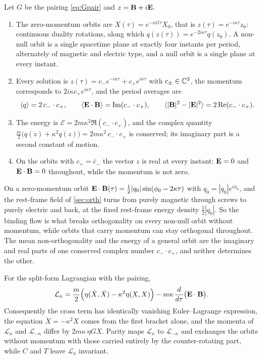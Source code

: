 \begin{proposition}
\label{prop:orbitsEM}
Let $G$ be the pairing \eqref{eq:Gpair} and $z=\mathbf B+i\mathbf E$.
\begin{enumerate}[label=(\roman*),leftmargin=2.2em]
\item The zero-momentum orbits are $X(\tau)=e^{-\kappa G\tau}X_0$, that is $z(\tau)=e^{-i\kappa\tau}z_0$: continuous duality rotations, along which
$q(z(\tau))=e^{-2i\kappa\tau}q(z_0)$. A non-null orbit is a single spacetime plane at exactly four instants per period, alternately of magnetic
and electric type, and a null orbit is a single plane at every instant.
\item Every solution is $z(\tau)=c_-e^{-i\kappa\tau}+c_+e^{i\kappa\tau}$ with $c_\pm\in\mathbb{C}^3$, the momentum corresponds to $2i\kappa c_+e^{i\kappa\tau}$, and the
period averages are
\[
\langle q\rangle=2\,c_-\cdot c_+,\qquad \langle\mathbf E\cdot\mathbf B\rangle=\operatorname{Im}(c_-\cdot c_+),\qquad \langle|\mathbf B|^2-|\mathbf E|^2\rangle=2\operatorname{Re}(c_-\cdot c_+).
\]
\item The energy is $\mathcal E=2m\kappa^2\Re(c_-\cdot c_+)$, and the complex quantity $\tfrac m2\bigl(q(\dot z)+\kappa^2q(z)\bigr)=2m\kappa^2\,c_-\cdot c_+$ is
conserved; its imaginary part is a second constant of motion.
\item On the orbits with $c_+=\bar c_-$ the vector $z$ is real at every instant: $\mathbf E=0$ and $\mathbf E\cdot\mathbf B=0$ throughout, while the momentum is not
zero.
\end{enumerate}
\end{proposition}

On a zero-momentum orbit $\mathbf E\cdot\mathbf B(\tau)=\tfrac12|q_0|\sin(\phi_0-2\kappa\tau)$ with $q_0=|q_0|e^{i\phi_0}$, and the rest-frame field of
\cref{sec:orth} turns from purely magnetic through screws to purely electric and back, at the fixed rest-frame energy density
$\tfrac12|q_0|$. So the binding flow is what breaks orthogonality on every non-null orbit without momentum, while orbits that carry momentum
can stay orthogonal throughout. The mean non-orthogonality and the energy of a general orbit are the imaginary and real parts of one conserved
complex number $c_-\cdot c_+$, and neither determines the other.

\begin{theorem}
\label{thm:EBsplit}
For the split-form Lagrangian with the pairing,
\[
\mathcal L_\kappa=\frac m2\Bigl(\eta(\dot X,\dot X)-\kappa^2\eta(X,X)\Bigr)-m\kappa\,\frac{d}{d\tau}\bigl(\mathbf E\cdot\mathbf B\bigr).
\]
Consequently the cross term has identically vanishing Euler--Lagrange expression, the equation $\ddot X=-\kappa^2X$ comes from the first bracket
alone, and the momenta of $\mathcal L_\kappa$ and $\mathcal L_{-\kappa}$ differ by $2m\kappa\,\eta GX$. Parity maps $\mathcal L_\kappa$ to $\mathcal L_{-\kappa}$
and exchanges the orbits without momentum with those carried entirely by the counter-rotating part, while $C$ and $T$ leave $\mathcal L_\kappa$
invariant.
\end{theorem}

